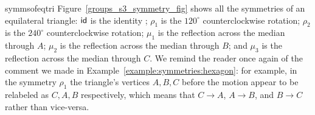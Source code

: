 \begin{example}{symmsofeqtri}
Figure~\ref{groups_s3_symmetry_fig} shows all the symmetries of an equilateral triangle:  ${\sf{i}d}$ is the identity  ; $\rho_1$ is the $120^\circ$ counterclockwise rotation; $\rho_2$ is the $240^\circ$ counterclockwise rotation; $\mu_1$ is the reflection across the median through $A$; $\mu_2$ is the reflection across the median through $B$; and $\mu_3$ is the reflection across the median through $C$. We remind the reader once again of the comment we made in Example~\ref{example:symmetries:hexagon}: for example, in the symmetry $\rho_1$ the triangle's vertices $A,B,C$ before the motion appear to be relabeled as $C,A,B$ respectively, which means that $C \rightarrow A$, $A \rightarrow B$, and $B \rightarrow C$ rather than vice-versa.

\begin{figure}[htp] %
\begin{center}
\end{center}
\end{figure}
\end{example}
